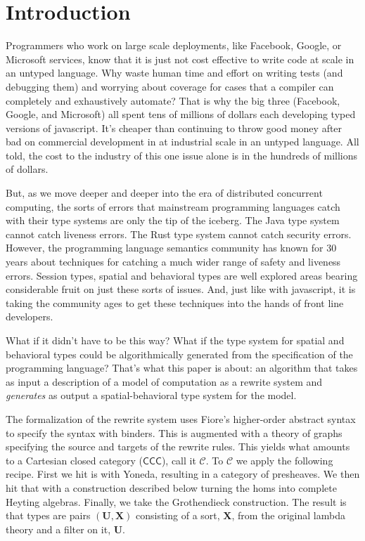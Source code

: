 \section{Introduction}\label{sec:introduction} %

Programmers who work on large scale deployments, like Facebook,
Google, or Microsoft services, know that it is just not cost effective
to write code at scale in an untyped language. Why waste human time
and effort on writing tests (and debugging them) and worrying about
coverage for cases that a compiler can completely and exhaustively
automate? That is why the big three (Facebook, Google, and Microsoft)
all spent tens of millions of dollars each developing typed versions
of javascript. It's cheaper than continuing to throw good money
after bad on commercial development in at industrial scale in an
untyped language. All told, the cost to the industry of this one issue
alone is in the hundreds of millions of dollars.

But, as we move deeper and deeper into the era of distributed
concurrent computing, the sorts of errors that mainstream programming
languages catch with their type systems are only the tip of the
iceberg. The Java type system cannot catch liveness errors. The Rust
type system cannot catch security errors. However, the programming
language semantics community has known for 30 years about techniques
for catching a much wider range of safety and liveness errors. Session
types, spatial and behavioral types are well explored areas bearing
considerable fruit on just these sorts of issues. And, just like with
javascript, it is taking the community ages to get these techniques
into the hands of front line developers.

What if it didn't have to be this way? What if the type system for
spatial and behavioral types could be algorithmically generated from
the specification of the programming language? That's what this paper
is about: an algorithm that takes as input a description of a model of
computation as a rewrite system and \emph{generates} as output a
spatial-behavioral type system for the model.

The formalization of the rewrite system uses Fiore's higher-order
abstract syntax to specify the syntax with binders. This is augmented
with a theory of graphs specifying the source and targets of the
rewrite rules. This yields what amounts to a Cartesian closed category
($\mathsf{CCC}$), call it $\mathcal{C}$. To $\mathcal{C}$ we apply the
following recipe. First we hit is with Yoneda, resulting in a category
of presheaves. We then hit that with a construction described below
turning the homs into complete Heyting algebras. Finally, we take the
Grothendieck construction. The result is that types are pairs
$(\mathbf{U}, \mathbf{X})$ consisting of a sort, $\mathbf{X}$, from
the original lambda theory and a filter on it, $\mathbf{U}$.

